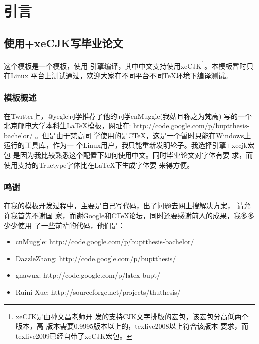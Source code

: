 \documentclass[a4paper,oneside,12pt]{book}
\begin{document}
\frontmatter\tableofcontents %

\newpage\mainmatter
{} %
\pagestyle{fancy} %


\chapter{引言}
\section{使用\XeLaTeX{}+xeCJK写毕业论文}
这个模板是一个\XeLaTeX{}模板，\cite{bib:book01}使用\XeLaTeX{}
引擎编译，其中中文支持使用xeCJK\footnote{xeCJK是由孙文昌老师开
发的支持CJK文字排版的\XeLaTeX{}宏包，该宏包分高低两个版本，高
版本需要0.9995版本以上的\XeLaTeX{}，texlive2008以上符合该版本
要求，而texlive2009已经自带了xeCJK宏包。}。本模板暂时只在Linux
平台上测试通过，欢迎大家在不同平台不同\TeX{}环境下编译测试。

\subsection{模板概述}
在Twitter上，@yegle同学推荐了他的同学cnMuggle(我姑且称之为梵高)
写的一个北京邮电大学本科生\LaTeX{}模板，网址在: 
http://code.google.com/p/buptthesis-bachelor/ 。但是由于梵高同
学使用的是CTeX，这是一个暂时只能在Windows上运行的工具库，作为一
个Linux用户，我只能重新发明轮子。我选择\XeLaTeX{}引擎+xecjk宏包
是因为我比较熟悉这个配置下如何使用中文。同时毕业论文对字体有要
求，而使用\XeLaTeX{}支持的Truetype字体比在\LaTeX{}下生成字体要
来得方便。

\subsection{鸣谢}
在我的模板开发过程中，主要是自己写代码，出了问题去网上搜解决方案，
\cite{bib:book02,bib:article01,bib:article02}请允许我首先不谢国
家，而谢Google和CTeX论坛，同时还要感谢前人的成果，我多多少少使用
了一些前辈的代码，他们是：

\begin{itemize}
    \item cnMuggle: http://code.google.com/p/buptthesis-bachelor/
    \item DazzleZhang: http://code.google.com/p/buptthesis/
    \item gnawux: http://code.google.com/p/latex-bupt/
    \item Ruini Xue: http://sourceforge.net/projects/thuthesis/
\end{itemize}
\end{document}
